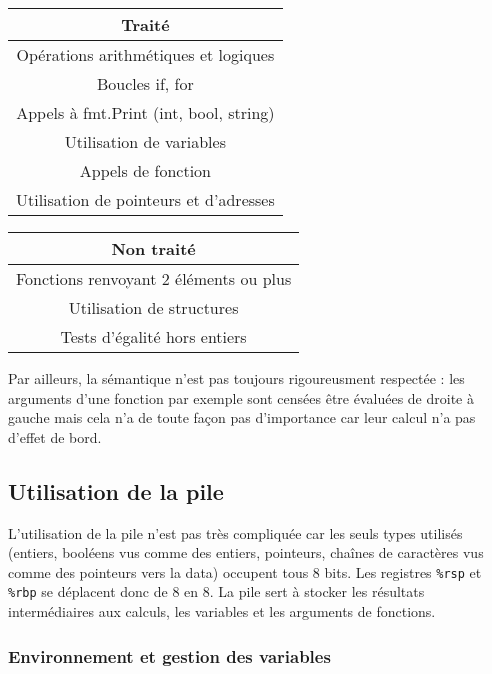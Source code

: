 \documentclass{scrartcl}
\begin{document}
\begin{multicols}{2}

\begin{center}
\begin{tabular}{|c|}
     \hline
     Traité \\
     \hline
     Opérations arithmétiques et logiques \\
     Boucles if, for \\
     Appels à fmt.Print (int, bool, string) \\
     Utilisation de variables \\
     Appels de fonction \\
     Utilisation de pointeurs et d'adresses \\
     \hline
\end{tabular}
\end{center}

\columnbreak
\begin{center}
\begin{tabular}{|c|}
     \hline
     Non traité \\
     \hline
     Fonctions renvoyant 2 éléments ou plus \\
     Utilisation de structures \\
     Tests d'égalité hors entiers \\
     \hline
\end{tabular}
\end{center}

\end{multicols}

Par ailleurs, la sémantique n'est pas toujours rigoureusment respectée : les arguments d'une fonction par exemple sont censées être évaluées de droite à gauche mais cela n'a de toute façon pas d'importance car leur calcul n'a pas d'effet de bord.


\subsection{Utilisation de la pile}

L'utilisation de la pile n'est pas très compliquée car les seuls types utilisés (entiers, booléens vus comme des entiers, pointeurs, chaînes de caractères vus comme des pointeurs vers la data) occupent tous 8 bits. Les registres \texttt{\%rsp} et \texttt{\%rbp} se déplacent donc de 8 en 8. La pile sert à stocker les résultats intermédiaires aux calculs, les variables et les arguments de fonctions.

\subsubsection*{Environnement et gestion des variables}
\end{document}
